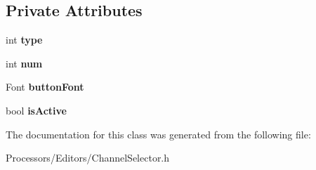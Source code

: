 \subsection*{Private Attributes}
\begin{DoxyCompactItemize}
\item 
\hypertarget{classChannelSelectorButton_a8fe985d2a919345df765645ab0739a34}{int {\bfseries type}}\label{classChannelSelectorButton_a8fe985d2a919345df765645ab0739a34}

\item 
\hypertarget{classChannelSelectorButton_a028cf4444da6e26567607fab6ce22480}{int {\bfseries num}}\label{classChannelSelectorButton_a028cf4444da6e26567607fab6ce22480}

\item 
\hypertarget{classChannelSelectorButton_afc4bc7b11806000fe2cd73bdee3162e8}{Font {\bfseries button\-Font}}\label{classChannelSelectorButton_afc4bc7b11806000fe2cd73bdee3162e8}

\item 
\hypertarget{classChannelSelectorButton_a233145792539cd5f20fefaa60ca568f1}{bool {\bfseries is\-Active}}\label{classChannelSelectorButton_a233145792539cd5f20fefaa60ca568f1}

\end{DoxyCompactItemize}


The documentation for this class was generated from the following file\-:\begin{DoxyCompactItemize}
\item 
Processors/\-Editors/Channel\-Selector.\-h\end{DoxyCompactItemize}
